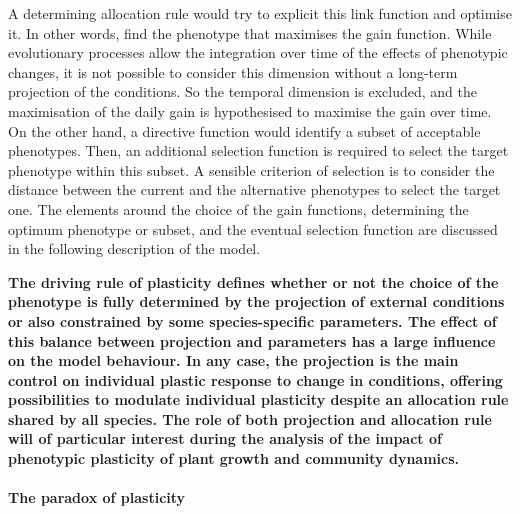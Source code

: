 A determining allocation rule would try to explicit this link function and optimise it. In other words, find the phenotype that maximises the gain function. While evolutionary processes allow the integration over time of the effects of phenotypic changes, it is not possible to consider this dimension without a long-term projection of the conditions. So the temporal dimension is excluded, and the maximisation of the daily gain is hypothesised to maximise the gain over time. On the other hand, a directive function would identify a subset of acceptable phenotypes. Then, an additional selection function is required to select the target phenotype within this subset. A sensible criterion of selection is to consider the distance between the current and the alternative phenotypes to select the target one. The elements around the choice of the gain functions, determining the optimum phenotype or subset, and the eventual selection function are discussed in the following description of the model.

\textbf{
The driving rule of plasticity defines whether or not the choice of the phenotype is fully determined by the projection of external conditions or also constrained by some species-specific parameters. The effect of this balance between projection and parameters has a large influence on the model behaviour. In any case, the projection is the main control on individual plastic response to change in conditions, offering possibilities to modulate individual plasticity despite an allocation rule shared by all species. The role of both projection and allocation rule will of particular interest during the analysis of the impact of phenotypic plasticity of plant growth and community dynamics.}

\paragraph{The paradox of plasticity}

